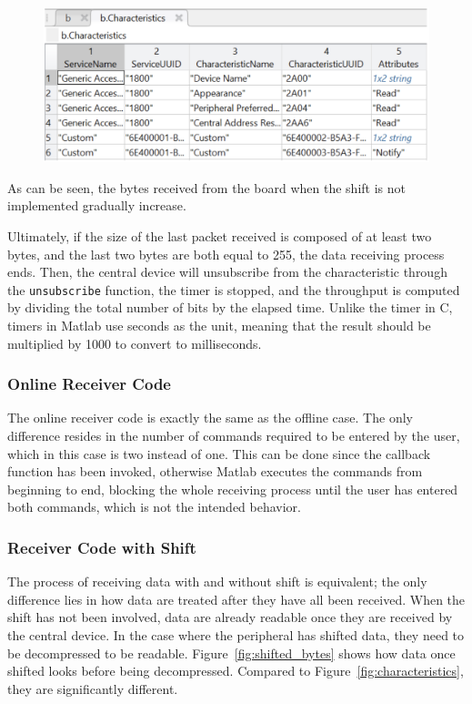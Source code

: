 \documentclass{Configuration_Files/PoliMi3i_thesis}
\begin{document}
\begin{figure}[H]
    \centering
    \includegraphics[scale=0.3]{Board Windows PC/5.png}
    \label{fig:nrf_connect_log}
\end{figure}

As can be seen, the bytes received from the board when the shift is not implemented gradually increase.

Ultimately, if the size of the last packet received is composed of at least two bytes, and the last two bytes are both equal to 255, the data receiving process ends. Then, the central device will unsubscribe from the characteristic through the \texttt{unsubscribe} function, the timer is stopped, and the throughput is computed by dividing the total number of bits by the elapsed time. Unlike the timer in C, timers in Matlab use seconds as the unit, meaning that the result should be multiplied by 1000 to convert to milliseconds.

\subsubsection{Online Receiver Code}

The online receiver code is exactly the same as the offline case. The only difference resides in the number of commands required to be entered by the user, which in this case is two instead of one. This can be done since the callback function has been invoked, otherwise Matlab executes the commands from beginning to end, blocking the whole receiving process until the user has entered both commands, which is not the intended behavior.

\subsubsection{Receiver Code with Shift}

The process of receiving data with and without shift is equivalent; the only difference lies in how data are treated after they have all been received. When the shift has not been involved, data are already readable once they are received by the central device. In the case where the peripheral has shifted data, they need to be decompressed to be readable. Figure~\ref{fig:shifted_bytes} shows how data once shifted looks before being decompressed. Compared to Figure~\ref{fig:characteristics}, they are significantly different.
\end{document}
